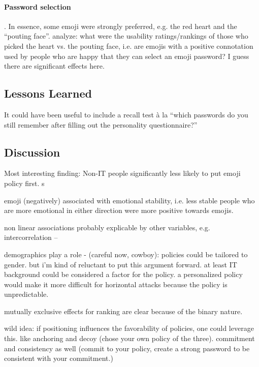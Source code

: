 \paragraph{Password selection}

. In essence, some emoji were strongly preferred, e.g. the red heart and the ``pouting face''. analyze: what were the usability ratings/rankings of those who picked the heart vs. the pouting face, i.e. are emojis with a positive connotation used by people who are happy that they can select an emoji password? I guess there are significant effects here. 

\subsection{Lessons Learned}
It could have been useful to include a recall test à la ``which passwords do you still remember after filling out the personality questionnaire?'' 

\subsection{Discussion}
Most interesting finding: Non-IT people significantly less likely to put emoji policy first. s

emoji (negatively) associated with emotional stability, i.e. less stable people who are more emotional in either direction were more positive towards emojis.

non linear associations probably explicable by other variables, e.g. intercorrelation -- 

demographics play a role - (careful now, cowboy): policies could be tailored to gender. but i'm kind of reluctant to put this argument forward. at least IT background could be considered a factor for the policy. a personalized policy would make it more difficult for horizontal attacks because the policy is unpredictable.

mutually exclusive effects for ranking are clear because of the binary nature.

wild idea: if positioning influences the favorability of policies, one could leverage this. like anchoring and decoy (chose your own policy of the three). commitment and consistency as well (commit to your policy, create a strong password to be consistent with your commitment.)